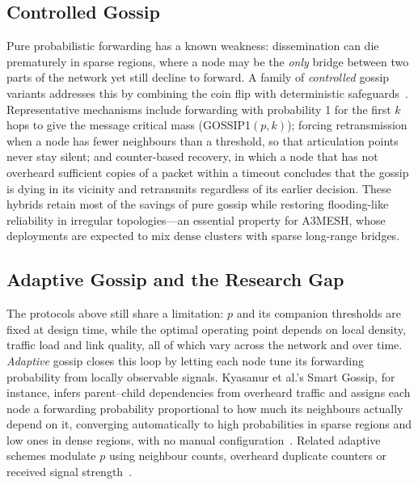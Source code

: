 \documentclass[english,bachelor]{tfgitic}[2026/01/22]
\begin{document}
\subsection{Controlled Gossip}

Pure probabilistic forwarding has a known weakness: dissemination can die prematurely in sparse regions, where a node may be the \emph{only} bridge between two parts of the network yet still decline to forward. A family of \emph{controlled} gossip variants addresses this by combining the coin flip with deterministic safeguards~\cite{haas2006gossip,williams2002comparison}. Representative mechanisms include forwarding with probability 1 for the first $k$ hops to give the message critical mass (GOSSIP1$(p,k)$); forcing retransmission when a node has fewer neighbours than a threshold, so that articulation points never stay silent; and counter-based recovery, in which a node that has not overheard sufficient copies of a packet within a timeout concludes that the gossip is dying in its vicinity and retransmits regardless of its earlier decision. These hybrids retain most of the savings of pure gossip while restoring flooding-like reliability in irregular topologies---an essential property for A3MESH, whose deployments are expected to mix dense clusters with sparse long-range bridges.

\subsection{Adaptive Gossip and the Research Gap}

The protocols above still share a limitation: $p$ and its companion thresholds are fixed at design time, while the optimal operating point depends on local density, traffic load and link quality, all of which vary across the network and over time. \emph{Adaptive} gossip closes this loop by letting each node tune its forwarding probability from locally observable signals. Kyasanur et al.'s Smart Gossip, for instance, infers parent--child dependencies from overheard traffic and assigns each node a forwarding probability proportional to how much its neighbours actually depend on it, converging automatically to high probabilities in sparse regions and low ones in dense regions, with no manual configuration~\cite{kyasanur2006smartgossip}. Related adaptive schemes modulate $p$ using neighbour counts, overheard duplicate counters or received signal strength~\cite{williams2002comparison}.
\end{document}
